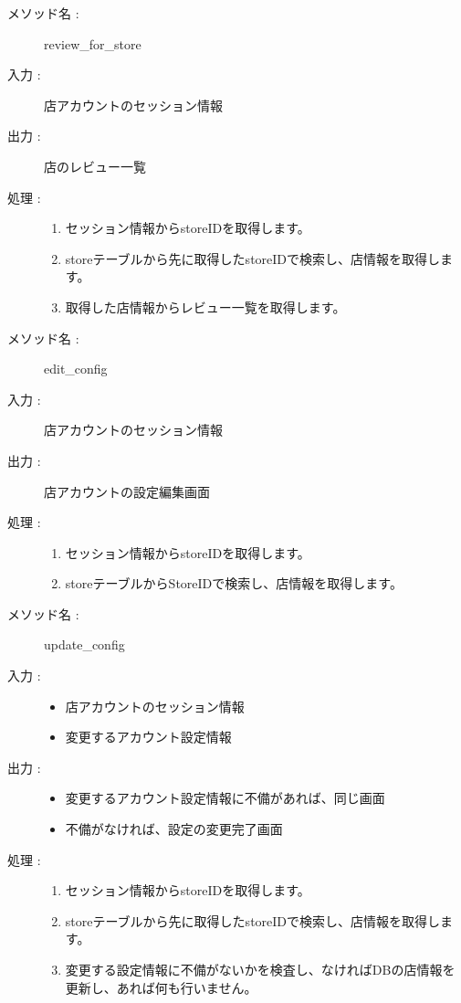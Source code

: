 \documentclass[a4j,titlepage]{jarticle}
\begin{document}
\begin{description}
  \item [メソッド名 :] review\_for\_store
  \item [入力 :] 店アカウントのセッション情報
  \item [出力 :] 店のレビュー一覧
  \item [処理 :]\mbox{}
  \begin{enumerate}
    \item セッション情報からstoreIDを取得します。
    \item storeテーブルから先に取得したstoreIDで検索し、店情報を取得します。
    \item 取得した店情報からレビュー一覧を取得します。
  \end{enumerate}
\end{description}

\begin{description}
  \item [メソッド名 :] edit\_config
  \item [入力 :] 店アカウントのセッション情報
  \item [出力 :] 店アカウントの設定編集画面
  \item [処理 :]\mbox{}
  \begin{enumerate}
    \item セッション情報からstoreIDを取得します。
    \item storeテーブルからStoreIDで検索し、店情報を取得します。
  \end{enumerate}
\end{description}

\begin{description}
  \item [メソッド名 :] update\_config
  \item [入力 :]\mbox{}
  \begin{itemize}
    \item 店アカウントのセッション情報
    \item 変更するアカウント設定情報
  \end{itemize}
  \item [出力 :]\mbox{}
  \begin{itemize}
    \item 変更するアカウント設定情報に不備があれば、同じ画面
    \item 不備がなければ、設定の変更完了画面
  \end{itemize}
  \item [処理 :]\mbox{}
  \begin{enumerate}
    \item セッション情報からstoreIDを取得します。
    \item storeテーブルから先に取得したstoreIDで検索し、店情報を取得します。
    \item 変更する設定情報に不備がないかを検査し、なければDBの店情報を更新し、あれば何も行いません。
  \end{enumerate}
\end{description}
\end{document}
